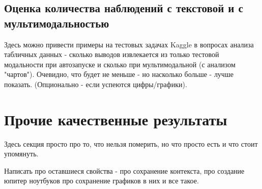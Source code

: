 \subsection{Оценка количества наблюдений с текстовой и с мультимодальностью} \label{ch4:sec1:subsec4}


Здесь можно привести примеры на тестовых задачах Kaggle в вопросах анализа табличных данных
- сколько выводов извлекается из только тестовой модальности при автозапуске и сколько 
при мультимодальной (с анализом "чартов"). Очевидно, что будет не меньше - но насколько больше
- лучше показать. (Опционально - если успеются цифры/графики).


\section{Прочие качественные результаты} \label{ch4:sec2}

Здесь секция просто про то, что нельзя померить, но что просто есть и что стоит упомянуть.

Написать про оставшиеся свойства - про сохранение контекста, про создание юпитер ноутбуков
про сохранение графиков в них и все такое.
